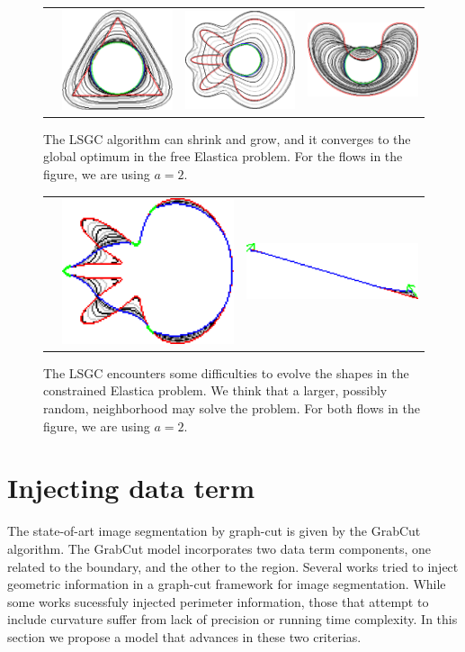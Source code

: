 \begin{figure}
\begin{tabular}{cccc}
&\includegraphics[scale=0.25]{figures/chapter8/graph-flow/triangle/neigh-2/summary.pdf} & \includegraphics[scale=0.25]{figures/chapter8/graph-flow/flower/neigh-2/summary.pdf} & \includegraphics[scale=0.25]{figures/chapter8/graph-flow/bean/neigh-2/summary.pdf}
\end{tabular}
\caption{The LSGC algorithm can shrink and grow, and it converges to the global optimum in the free Elastica problem. For the flows in the figure, we are using $a=2$.}
\label{fig:graph-flow-neigh2-results}
\end{figure}


\begin{figure}
\begin{tabular}{ccc}
&\includegraphics[scale=0.4]{figures/chapter8/constrained-elastica/flower-1/lp-0.001/summary.pdf} & \includegraphics[scale=0.4]{figures/chapter8/constrained-elastica/curve-3/lp-0.001/summary.pdf}
\end{tabular}
\caption{The LSGC encounters some difficulties to evolve the shapes in the constrained Elastica problem. We think that a larger, possibly random, neighborhood may solve the problem. For both flows in the figure, we are using $a=2$.}
\label{fig:graph-flow-constrained}
\end{figure}

\section{Injecting data term}

The state-of-art image segmentation by graph-cut is given by the GrabCut algorithm. The GrabCut model incorporates two data term components, one related to the boundary, and the other to the region. Several works tried to inject geometric information in a graph-cut framework for image segmentation. While some works sucessfuly injected perimeter information, those that attempt to include curvature suffer from lack of precision or running time complexity. In this section we propose a model that advances in these two criterias.
